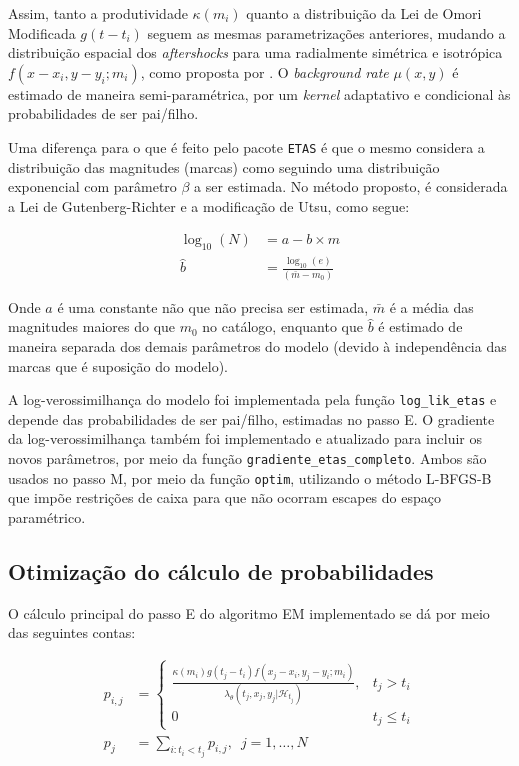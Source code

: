 \documentclass[11pt,]{article}
\begin{document}
Assim, tanto a produtividade \(\kappa(m_{i})\) quanto a distribuição da
Lei de Omori Modificada \(g(t - t_{i})\) seguem as mesmas
parametrizações anteriores, mudando a distribuição espacial dos
\emph{aftershocks} para uma radialmente simétrica e isotrópica
\(f(x - x_{i}, y - y_{i};m_{i})\), como proposta por \cite{Ogata_1988}.
O \emph{background rate} \(\mu(x,y)\) é estimado de maneira
semi-paramétrica, por um \emph{kernel} adaptativo e condicional às
probabilidades de ser pai/filho.

Uma diferença para o que é feito pelo pacote \texttt{ETAS} é que o mesmo
considera a distribuição das magnitudes (marcas) como seguindo uma
distribuição exponencial com parâmetro \(\beta\) a ser estimada. No
método proposto, é considerada a Lei de Gutenberg-Richter e a
modificação de Utsu, como segue:

\begin{align*}
\log_{10}(N) &= a - b \times m \\
\hat{b} &= \frac{\log_{10}(e)}{\left(\bar{m} - m_{0}\right)}
\end{align*}

Onde \(a\) é uma constante não que não precisa ser estimada, \(\bar{m}\)
é a média das magnitudes maiores do que \(m_{0}\) no catálogo, enquanto
que \(\hat{b}\) é estimado de maneira separada dos demais parâmetros do
modelo (devido à independência das marcas que é suposição do modelo).

A log-verossimilhança do modelo foi implementada pela função
\texttt{log_lik_etas} e depende das probabilidades de ser pai/filho,
estimadas no passo E. O gradiente da log-verossimilhança também foi
implementado e atualizado para incluir os novos parâmetros, por meio da
função \texttt{gradiente_etas_completo}. Ambos são usados no passo M,
por meio da função \texttt{optim}, utilizando o método L-BFGS-B que
impõe restrições de caixa para que não ocorram escapes do espaço
paramétrico.

\hypertarget{otimizauxe7uxe3o-do-cuxe1lculo-de-probabilidades}{%
\subsection{Otimização do cálculo de
probabilidades}\label{otimizauxe7uxe3o-do-cuxe1lculo-de-probabilidades}}

O cálculo principal do passo E do algoritmo EM implementado se dá por
meio das seguintes contas:

\begin{align*}
p_{i,j} &= \begin{cases}
\frac{\kappa(m_{i})g(t_{j} - t_{i})f(x_{j} - x_{i},y_{j} - y_{i};m_{i})}{\lambda_{\theta}(t_{j},x_{j},y_{j}|\mathcal{H}_{t_{j}})}, & t_{j} > t_{i} \\
0 & t_{j} \le t_{i}
\end{cases} \\
p_{j} &= \sum_{i: t_{i} < t_{j}}p_{i,j}, \,\,\, j = 1,\ldots,N
\end{align*}
\end{document}
